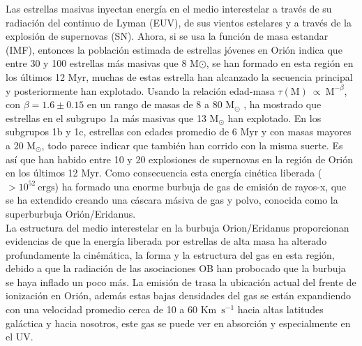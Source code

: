 Las estrellas masivas inyectan energía en el medio interestelar a través de su radiación del continuo de Lyman (EUV), de sus vientos estelares y a través de la explosión de supernovas (SN). Ahora, si se usa la función de masa estandar (IMF), entonces la población estimada de estrellas jóvenes en Orión indica que entre 30 y 100 estrellas más masivas que 8 M\(\odot\), se han formado en esta región en los últimos 12 Myr, muchas de estas estrella han alcanzado la secuencia principal y posteriormente han explotado. Usando la relación edad-masa \(\tau(\text{M})~\propto~\text{M}^{-\beta}\), con \(\beta = 1.6 \pm 0.15\) en un rango de masas de 8 a 80 \(\text{M}_{\odot}\) \citep{Shull:1995}, ha mostrado que estrellas en el subgrupo 1a más masivas que 13 \(\text{M}_{\odot}\) han explotado. En los subgrupos 1b y 1c, estrellas con edades promedio de 6 Myr y con masas mayores a 20 \(\text{M}_{\odot}\), todo parece indicar que también han corrido con la misma suerte. Es así que han habido entre 10 y 20 explosiones de supernovas en la región de Orión en los últimos 12 Myr. Como consecuencia esta energía cinética liberada (\(>10^{52}~\text{ergs}\)) ha formado una enorme burbuja de gas de emisión de rayos-x, que se ha extendido creando una cáscara másiva de gas y polvo, conocida como la superburbuja Orión/Eridanus.\\

La estructura del medio interestelar en la  burbuja Orion/Eridanus proporcionan evidencias de que la energía liberada por estrellas de alta masa ha alterado profundamente la cinémática, la forma y la estructura del gas en esta región, debido a que la radiación de las asociaciones OB han probocado que la burbuja se haya inflado un poco más. La emisión de \ha{} trasa la ubicación actual del frente de ionización en Orión, además estas bajas densidades del gas se están expandiendo con una velocidad promedio cerca de 10 a 60 Km~\(\text{s}^{-1}\) hacia altas latitudes galáctica y hacia nosotros, este gas se puede ver en absorción y especialmente en el UV.\\
         
